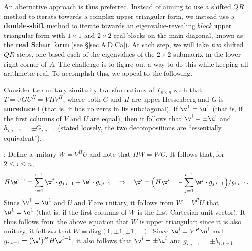 \begin{figure*}[t]
\end{figure*}

\noindent An alternative approach is thus preferred.  Instead of aiming to use a shifted $QR$ method to iterate towards a complex upper triangular form,
we instead use a {\bf double-shift} method to iterate towards an eigenvalue-revealing {\it block} upper triangular form with $1\times 1$ and $2\times 2$ real blocks on the
main diagonal, known as the {\bf real Schur form} (see \S \ref{sec.A.D.Ca}).  At each step, we will take {\it two} shifted $QR$ steps, one based each of the eigenvalues of the $2\times 2$ submatrix in the
lower-right corner of $A$.  The challenge is to figure out a way to do this while keeping all arithmetic real.  To accomplish this, we appeal to the following.

\begin{fact} \label{fact.implicitQ}
Consider two unitary similarity transformations of $T_{n\times n}$ such that\break $T = U G U^H = V H V^H$, where both $G$ and $H$ are upper Hessenberg and $G$ is {\bf unreduced} (that is, it has no zeros
in its subdiagonal).  If $\v^1=\u^1$ (that is, if the first columns of $V$ and $U$ are equal), then it follows that $\v^i=\pm\u^i$ and $h_{i,i-1}=\pm G_{i,i-1}$ (stated loosely, the two decompositions
are ``essentially equivalent'').
\end{fact}

\/: Define a unitary $W=V^H U$ and note that $HW = WG$.   It follows that, for $2\le i\le n$,
\begin{equation*}
H\w^{i-1} = \sum_{j=1}^{i-1} \w^j \cdot g_{j,i-1}  + \w^i \cdot g_{i,i-1} \quad \Rightarrow \quad \w^i = \Big( H\w^{i-1} - \sum_{j=1}^{i-1} \w^j \cdot g_{j,i-1} \Big)/ g_{i,i-1}.
\end{equation*}
Since $\v^1=\u^1$ and $U$ and $V$ are unitary, it follows from $W=V^H U$ that $\w^1=\e^1$ (that is, if the first columns of $W$ is the first Cartesian unit vector).
It thus follows from the above equation that $W$ is upper triangular; since it is also unitary, it follows that $W=\textrm{diag}(1,\pm 1,\pm 1,\ldots)$.
Since $\w^i=V^H \u^i$ and $g_{i,i-1}=(\w^i)^H H \w^{i-1}$, it also follows that $\v^i=\pm \u^i$ and $g_{i,i-1}=\pm h_{i,i-1}$.  \endproof

